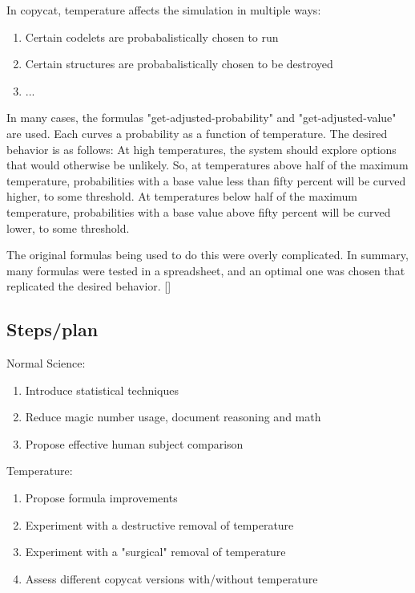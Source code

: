 \documentclass[a4paper]{article}
\begin{document}
In copycat, temperature affects the simulation in multiple ways:

\begin{enumerate}
    \item Certain codelets are probabalistically chosen to run
    \item Certain structures are probabalistically chosen to be destroyed
    \item ...
\end{enumerate}

In many cases, the formulas "get-adjusted-probability" and "get-adjusted-value" are used.
Each curves a probability as a function of temperature.
The desired behavior is as follows:
At high temperatures, the system should explore options that would otherwise be unlikely.
So, at temperatures above half of the maximum temperature, probabilities with a base value less than fifty percent will be curved higher, to some threshold.
At temperatures below half of the maximum temperature, probabilities with a base value above fifty percent will be curved lower, to some threshold.

The original formulas being used to do this were overly complicated.
In summary, many formulas were tested in a spreadsheet, and an optimal one was chosen that replicated the desired behavior.
[]






\subsection{Steps/plan}

Normal Science:
\begin{enumerate}
	\item Introduce statistical techniques
    \item Reduce magic number usage, document reasoning and math
    \item Propose effective human subject comparison
\end{enumerate}
Temperature:
\begin{enumerate}
	\item Propose formula improvements
    \item Experiment with a destructive removal of temperature
    \item Experiment with a "surgical" removal of temperature
    \item Assess different copycat versions with/without temperature
\end{enumerate}
\end{document}
